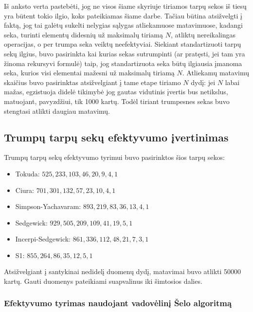 \documentclass{VUMIFInfKursinis}
\begin{document}
Iš anksto verta pastebėti, jog ne visos šiame skyriuje tiriamos tarpų sekos iš tiesų yra būtent tokio ilgio, koks pateikiamas šiame darbe.
Tačiau būtina atsižvelgti į faktą, jog tai galėtų sukelti nelygias sąlygas atliekamuose matavimuose,
kadangi seka, turinti elementų didesnių už maksimalų tiriamą $N$, atliktų nereikalingas operacijas, o per trumpa seka veiktų neefektyviai.
Siekiant standartizuoti tarpų sekų ilgius, buvo pasirinkta kai kurias sekas sutrumpinti (ar pratęsti, jei tam yra žinoma rekursyvi formulė)
taip, jog standartizuota seka būtų ilgiausia įmanoma seka, kurios visi elementai mažesni už maksimalų tiriamą $N$.
Atliekamų matavimų skaičius buvo pasirinktas atsižvelgiant į tame etape tiriamo $N$ dydį: jei $N$ labai mažas,
egzistuoja didelė tikimybė jog gautas vidutinis įvertis bus netikslus, matuojant, pavyzdžiui, tik 1000 kartų.
Todėl tiriant trumpesnes sekas buvo stengtasi atlikti daugiau matavimų.

\subsection{Trumpų tarpų sekų efektyvumo įvertinimas}
Trumpų tarpų sekų efektyvumo tyrimui buvo pasirinktos šios tarpų sekos:
\begin{itemize}
  \item Tokuda: $525, 233, 103, 46, 20, 9, 4, 1$ \cite{10.5555/645569.659879}
  \item Ciura: $701, 301, 132, 57, 23, 10, 4, 1$ \cite{ciura2001best}
  \item Simpson-Yachavaram: $893, 219, 83, 36, 13, 4, 1$ \cite{simpson1999faster}
  \item Sedgewick: $929, 505, 209, 109, 41, 19, 5, 1$ \cite{SEDGEWICK1986159}
  \item Incerpi-Sedgewick: $861, 336, 112, 48, 21, 7, 3, 1$ \cite{incerpi1985improved}
  \item S1: $855, 264, 86, 35, 12, 5, 1$
\end{itemize}

Atsižvelgiant į santykinai nedidelį duomenų dydį, matavimai buvo atlikti 50000 kartų.
Gauti duomenys pateikiami suapvalinus iki šimtosios dalies.

\subsubsection{Efektyvumo tyrimas naudojant vadovėlinį Šelo algoritmą}
\end{document}
